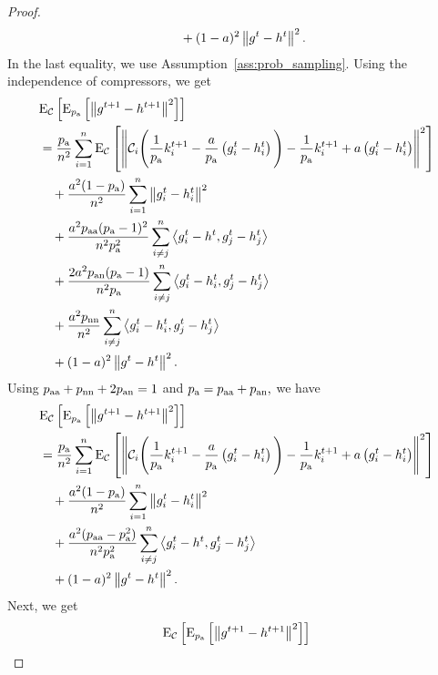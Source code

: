 \documentclass{article}
\newcommand*{\probavailable}{\ensuremath{p_{\textnormal{a}}}}
\newcommand*{\probpairaa}{\ensuremath{p_{\textnormal{aa}}}}
\newcommand*{\probpairan}{\ensuremath{p_{\textnormal{an}}}}
\newcommand*{\probpairnn}{\ensuremath{p_{\textnormal{nn}}}}
\begin{document}
\begin{proof}
\begin{align*}
    &\quad + (1 - a)^2\left\| g^{t} - h^{t} \right\|^2.\\
  \end{align*}
  In the last equality, we use Assumption~\ref{ass:prob_sampling}. Using the independence of compressors, we get
  \begin{align*}
    &\ExpSub{\cC}{\ExpSub{\probavailable}{\norm{g^{t+1} - h^{t+1}}^2}} \\
    &=\frac{\probavailable}{n^2}\sum_{i=1}^n\ExpSub{\cC}{\norm{\cC_i\Bigg(\frac{1}{\probavailable}k^{t+1}_i - \frac{a}{\probavailable} \left(g^{t}_i - h^{t}_i\right)\Bigg) - \frac{1}{\probavailable}k^{t+1}_i + a \left(g^{t}_i - h^{t}_i\right)}^2} \\
    &\quad+ \frac{a^2 (1 - \probavailable)}{n^2}\sum_{i=1}^n\norm{g^{t}_i - h^{t}_i}^2 \\
    &\quad +\frac{a^2 \probpairaa (\probavailable - 1)^2}{n^2 \probavailable^2}\sum_{i \neq j}^n\inp{g^{t}_i - h^{t}}{g^{t}_j - h^{t}_j} \\
    &\quad +\frac{2a^2\probpairan (\probavailable - 1)}{n^2 \probavailable}\sum_{i \neq j}^n\inp{g^{t}_i - h^{t}_i}{g^{t}_j - h^{t}_j} \\
    &\quad +\frac{a^2 \probpairnn}{n^2}\sum_{i \neq j}^n\inp{g^{t}_i - h^{t}_i}{g^{t}_j - h^{t}_j} \\
    &\quad + (1 - a)^2\norm{g^{t} - h^{t}}^2.\\
  \end{align*}
  Using $\probpairaa + \probpairnn + 2\probpairan = 1$ and $\probavailable = \probpairaa + \probpairan,$ we have
  \begin{align*}
    &\ExpSub{\cC}{\ExpSub{\probavailable}{\norm{g^{t+1} - h^{t+1}}^2}} \\
    &=\frac{\probavailable}{n^2}\sum_{i=1}^n\ExpSub{\cC}{\norm{\cC_i\Bigg(\frac{1}{\probavailable}k^{t+1}_i - \frac{a}{\probavailable} \left(g^{t}_i - h^{t}_i\right)\Bigg) - \frac{1}{\probavailable}k^{t+1}_i + a \left(g^{t}_i - h^{t}_i\right)}^2} \\
    &\quad+ \frac{a^2 (1 - \probavailable)}{n^2}\sum_{i=1}^n\norm{g^{t}_i - h^{t}_i}^2 \\
    &\quad +\frac{a^2 (\probpairaa - \probavailable^2)}{n^2 \probavailable^2}\sum_{i \neq j}^n\inp{g^{t}_i - h^{t}}{g^{t}_j - h^{t}_j} \\
    &\quad + (1 - a)^2\norm{g^{t} - h^{t}}^2.\\
  \end{align*}
  Next, we get
  \begin{align*}
    &\ExpSub{\cC}{\ExpSub{\probavailable}{\norm{g^{t+1} - h^{t+1}}^2}} \\

\end{align*}
\end{proof}
\end{document}
